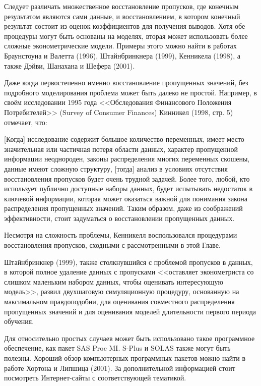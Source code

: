 Следует различать множественное восстановление пропусков, где конечным результатом являются сами данные, и восстановлением, в котором конечный результат состоит из оценок коэффициентов для получения выводов. Хотя обе процедуры могут быть основаны на моделях, вторая может использовать более сложные эконометрические модели. Примеры этого можно найти в работах Браунстоуна и Валетта (1996), Штайнбринкнера (1999), Кенникела (1998), а также Дэйви, Шанахана и Шефера (2001).

Даже когда первостепенно именно восстановление пропущенных значений, без подробного моделирования проблема может быть далеко не простой. Например, в своём исследовании 1995 года <<Обследования Финансового Положения Потребителей>> (Survey of Consumer Finances) Кинникел (1998, стр. 5) отмечает, что:

[Когда] исследование содержит большое количество переменных, имеет место значительная или частичная потеря области данных, характер пропущенной информации неоднороден, законы распределения многих переменных скошены, данные имеют сложную структуру, [тогда] анализ в условиях отсутствия восстановления пропусков будет очень трудной задачей. Более того, любой, кто использует публично доступные наборы данных, будет испытывать недостаток в ключевой информации, которая может оказаться важной для понимания закона распределения пропущенных значений. Таким образом, даже из соображений эффективности, стоит задуматься о  восстановлении пропущенных данных.

Несмотря на сложность проблемы, Кенникелл воспользовался процедурами восстановления пропусков, сходными с рассмотренными в этой Главе.

Штайнбринкнер (1999), также столкнувшийся с проблемой пропусков в данных, в которой полное удаление данных с пропусками <<оставляет эконометриста со слишком маленьким набором данных, чтобы оценивать интересующую модель>>, развил двухшаговую симуляционную процедуру, основанную на максимальном правдоподобии, для оценивания совместного распределения пропущенных значений и для оценивания моделей длительности первого периода обучения.

Для относительно простых случаев может быть использовано такое программное обеспечение, как пакет SAS Proc MI. S-Plus и SOLAS также могут быть полезны. Хороший обзор компьютерных программных пакетов можно найти в работе  Хортона и Липшица (2001). За дополнительной информацией стоит посмотреть Интернет-сайты с соответствующей тематикой.

